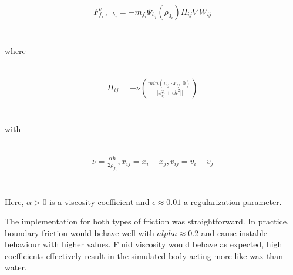\documentclass{ACGSeminar}
\begin{document}
\\
\begin{equation}
\begin{aligned}
F^v_{f_i \leftarrow b_j} = -m_{f_i}\Psi_{b_j}(\rho_{0_i})\Pi_{ij}\nabla W_{ij}
\end{aligned}
\end{equation}\\
\\

where

\\
\begin{equation}
\begin{aligned}
\Pi_{ij} = -\nu(\frac{min(v_{ij} \cdot x_{ij}, 0)}{||x^2_{ij} + \epsilon h^2||})
\end{aligned}
\end{equation}\\
\\

with

\\
\begin{equation}
\begin{aligned}
\nu = \frac{\alpha h}{2\rho_{f_i}}, x_{ij} = x_i - x_j, v_{ij} = v_i - v_j
\end{aligned}
\end{equation}\\
\\

Here, \(\alpha > 0\) is a viscosity coefficient and \(\epsilon \approx 0.01\) a regularization parameter. 

The implementation for both types of friction was straightforward. In practice, boundary friction would behave well with \(alpha \approx 0.2\) and cause instable behaviour with higher values.
Fluid viscosity would behave as expected, high coefficients effectively result in the simulated body acting more like wax than water. 
\end{document}
